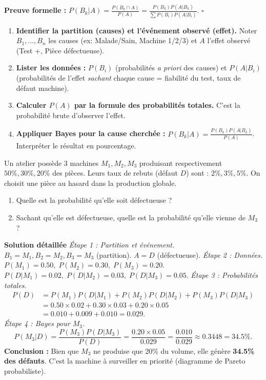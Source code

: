 \documentclass[11pt]{article}
\providecommand{\qed}{\hfill$\square$}
\begin{document}
\textbf{Preuve formelle :}
$P(B_k | A) = \frac{P(B_k \cap A)}{P(A)} = \frac{P(B_k)P(A|B_k)}{\sum P(B_i)P(A|B_i)}$. \qed

\begin{methode}
\begin{enumerate}
    \item \textbf{Identifier la partition (causes) et l'événement observé (effet).} Noter $B_1,\dots,B_n$ les causes (ex: Malade/Sain, Machine 1/2/3) et $A$ l'effet observé (Test +, Pièce défectueuse).
    \item \textbf{Lister les données :} $P(B_i)$ (probabilités \textit{a priori} des causes) et $P(A | B_i)$ (probabilités de l'effet \textit{sachant} chaque cause = fiabilité du test, taux de défaut machine).
    \item \textbf{Calculer $P(A)$ par la formule des probabilités totales.} C'est la probabilité brute d'observer l'effet.
    \item \textbf{Appliquer Bayes pour la cause cherchée :} $P(B_k | A) = \frac{P(B_k)P(A|B_k)}{P(A)}$. Interpréter le résultat en pourcentage.
\end{enumerate}
\end{methode}

\begin{exoresolu}
Un atelier possède 3 machines $M_1, M_2, M_3$ produisant respectivement $\num{50}\%, \num{30}\%, \num{20}\%$ des pièces.
Leurs taux de rebuts (défaut $D$) sont : $\num{2}\%, \num{3}\%, \num{5}\%$.
On choisit une pièce au hasard dans la production globale.
\begin{enumerate}
    \item Quelle est la probabilité qu'elle soit défectueuse ?
    \item Sachant qu'elle est défectueuse, quelle est la probabilité qu'elle vienne de $M_3$ ?
\end{enumerate}
\tcblower
\textbf{Solution détaillée}
\emph{Étape 1 : Partition et événement.}
$B_1=M_1, B_2=M_2, B_3=M_3$ (partition). $A = D$ (défectueuse).
\emph{Étape 2 : Données.}
$P(M_1)=\num{0,50},\; P(M_2)=\num{0,30},\; P(M_3)=\num{0,20}$.
$P(D|M_1)=\num{0,02},\; P(D|M_2)=\num{0,03},\; P(D|M_3)=\num{0,05}$.
\emph{Étape 3 : Probabilités totales.}
\begin{align*}
P(D) &= P(M_1)P(D|M_1) + P(M_2)P(D|M_2) + P(M_3)P(D|M_3) \\
     &= \num{0,50} \times \num{0,02} + \num{0,30} \times \num{0,03} + \num{0,20} \times \num{0,05} \\
     &= \num{0,010} + \num{0,009} + \num{0,010} = \num{0,029}.
\end{align*}
\emph{Étape 4 : Bayes pour $M_3$.}
\[
P(M_3 | D) = \frac{P(M_3)P(D|M_3)}{P(D)} = \frac{\num{0,20} \times \num{0,05}}{\num{0,029}} = \frac{\num{0,010}}{\num{0,029}} \approx \num{0,3448} = \num{34,5}\%.
\]
\textbf{Conclusion :} Bien que $M_3$ ne produise que \num{20}\% du volume, elle génère \textbf{\num{34,5}\% des défauts}. C'est la machine à surveiller en priorité (diagramme de Pareto probabiliste).
\end{exoresolu}
\end{document}
